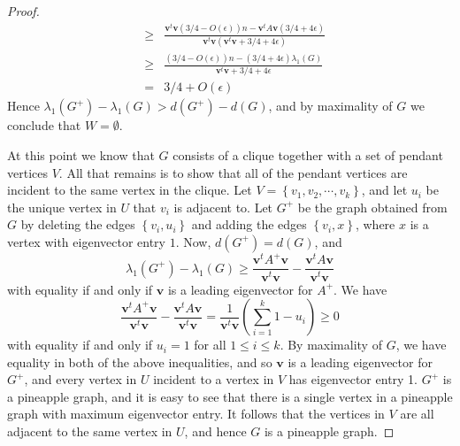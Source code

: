 \begin{proof}
\begin{eqnarray*}
 &\geq& \frac{\textbf{v}^t\textbf{v}(3/4-O(\epsilon))n - \textbf{v}^tA\textbf{v} (3/4 + 4\epsilon)}{\textbf{v}^t\textbf{v} (\textbf{v}^t\textbf{v} + 3/4 + 4\epsilon)}\\
 &\geq & \frac{(3/4-O(\epsilon))n - (3/4 + 4\epsilon)\lambda_1(G)}{\textbf{v}^t\textbf{v} + 3/4 + 4\epsilon} \\ 
 &= &  3/4 + O(\epsilon)
\end{eqnarray*}
Hence $\lambda_1(G^+) - \lambda_1(G) > d(G^+) - d(G)$, and by maximality of $G$ we conclude that $W = \emptyset$.

At this point we know that $G$ consists of a clique together with a set of pendant vertices $V$.  All that remains is to show that all of the pendant vertices  are incident to the same vertex in the clique.  Let $V = \left\{v_1, v_2, \cdots, v_k\right\}$, and let $u_i$ be the unique vertex in $U$ that $v_i$ is adjacent to.  Let $G^+$ be the graph obtained from $G$ by deleting the edges $\left\{v_i,u_i\right\}$ and adding the edges $\left\{v_i,x\right\}$, where $x$ is a vertex with eigenvector entry $1$.  Now, $d(G^+) = d(G)$, and 
\[ \lambda_1(G^+) -\lambda_1(G) \geq \frac{\textbf{v}^t A^+ \textbf{v}}{\textbf{v}^t\textbf{v}} - \frac{\textbf{v}^t A \textbf{v}}{\textbf{v}^t\textbf{v}}\]
with equality if and only if $\textbf{v}$ is a leading eigenvector for $A^+$.  We have
\[\frac{\textbf{v}^t A^+ \textbf{v}}{\textbf{v}^t\textbf{v}} - \frac{\textbf{v}^t A \textbf{v}}{\textbf{v}^t\textbf{v}} = \frac{1}{\textbf{v}^t\textbf{v}}\left( \sum_{i=1}^k 1 - u_i \right) \geq 0\]
with equality if and only if $u_i = 1$ for all $1 \leq i \leq k$.  By maximality of $G$, we have equality in both of the above inequalities, and so $\textbf{v}$ is a leading eigenvector for $G^+$, and every vertex in $U$ incident to a vertex in $V$ has eigenvector entry 1.  $G^+$ is a pineapple graph, and it is easy to see that there is a single vertex in a pineapple graph with maximum eigenvector entry.  It follows that the vertices in $V$ are all adjacent to the same vertex in $U$, and hence $G$ is a pineapple graph.

\end{proof}

